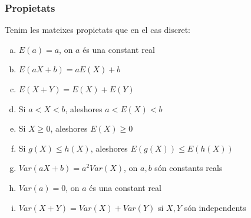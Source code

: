 \documentclass[12pt,t]{beamer}\usepackage[]{graphicx}\usepackage[]{color}
\newcommand{\blue}[1]{\textcolor{blue}{#1}}
\newcommand{\RR}{\mathbb{R}}
\renewcommand{\leq}{\leqslant}
\renewcommand{\geq}{\geqslant}
\theoremstyle{plain}
\theoremstyle{definition}
\begin{document}
 \begin{frame}
\frametitle{Propietats}
Tenim les mateixes propietats que en el cas discret:
\begin{enumerate}[a)]
\item $E(a)=a$, on $a$ és una constant real
\smallskip

\item $E(a X+b)=a E(X)+b$
\smallskip

\item $ E\left(X+Y\right)=E(X)+E(Y)$
\smallskip

\item Si $a<X<b$, aleshores $a<E(X)<b$
\smallskip

\item Si $X\geq 0$, aleshores $E(X)\geq 0$
\smallskip

\item Si $g(X)\leq h(X)$, aleshores $E(g(X))\leq E(h(X))$
\smallskip

\item $Var(aX+b)=a^2 Var(X)$, on $a,b$ són constants reals
\smallskip

\item $Var(a)=0$, on $a$ és una constant real
\smallskip

\item $Var(X+Y)=Var(X)+Var(Y)$ si $X,Y$ són independents
\end{enumerate}
\end{frame}


%
%
%
\end{document}
